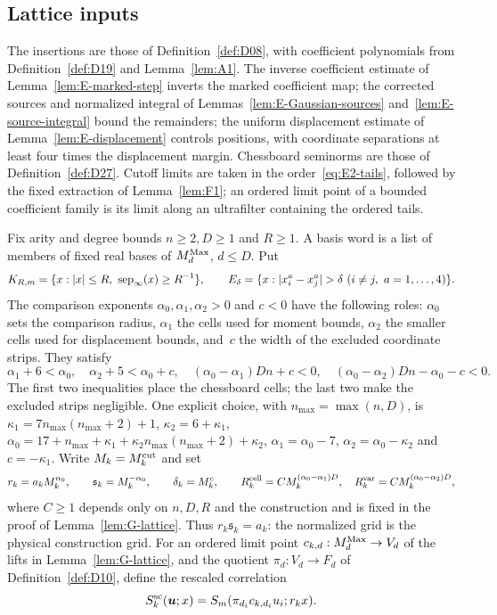 \subsection{Lattice inputs}\label{sec:G-lattice}

The insertions are those of Definition~\ref{def:D08}, with coefficient polynomials from Definition~\ref{def:D19} and Lemma~\ref{lem:A1}. The inverse coefficient estimate of Lemma~\ref{lem:E-marked-step} inverts the marked coefficient map; the corrected sources and normalized integral of Lemmas~\ref{lem:E-Gaussian-sources} and~\ref{lem:E-source-integral} bound the remainders; the uniform displacement estimate of Lemma~\ref{lem:E-displacement} controls positions, with coordinate separations at least four times the displacement margin. Chessboard seminorms are those of Definition~\ref{def:D27}. Cutoff limits are taken in the order~\eqref{eq:E2-tails}, followed by the fixed extraction of Lemma~\ref{lem:F1}; an ordered limit point of a bounded coefficient family is its limit along an ultrafilter containing the ordered tails.

Fix arity and degree bounds $n\ge2,D\ge1$ and $R\ge1$. A basis word is a list of members of fixed real bases of $M_{d}^{\mathrm{Max}}$, $d\le D$. Put
\begin{equation*}
K_{R,m}=\{x:|x|\le R,\ \sepinf(x)\ge R^{-1}\},\qquad
E_\delta=\{x:|x_i^a-x_j^a|>\delta\ (i\ne j,\ a=1,\ldots,4)\}.
\end{equation*}
The comparison exponents $\alpha_0,\alpha_1,\alpha_2>0$ and $c<0$ have the following roles: $\alpha_0$ sets the comparison radius, $\alpha_1$ the cells used for moment bounds, $\alpha_2$ the smaller cells used for displacement bounds, and~$c$ the width of the excluded coordinate strips. They satisfy
\begin{equation}\label{eq:G-exponents}
\alpha_1+6<\alpha_0,\quad \alpha_2+5<\alpha_0+c,\quad
(\alpha_0-\alpha_1)Dn+c<0,\quad
(\alpha_0-\alpha_2)Dn-\alpha_0-c<0.
\end{equation}
The first two inequalities place the chessboard cells; the last two make the excluded strips negligible. One explicit choice, with $n_{\max}=\max(n,D)$, is $\kappa_1=7n_{\max}(n_{\max}+2)+1$, $\kappa_2=6+\kappa_1$, $\alpha_0=17+n_{\max}+\kappa_1+\kappa_2n_{\max}(n_{\max}+2)+\kappa_2$, $\alpha_1=\alpha_0-7$, $\alpha_2=\alpha_0-\kappa_2$ and $c=-\kappa_1$. Write $M_k=M^{\mathrm{cut}}_k$ and set
\begin{equation}\label{eq:G-balance}
r_k=a_kM_k^{\alpha_0},\qquad \mathfrak s_k=M_k^{-\alpha_0},\qquad
\delta_k=M_k^{c},\qquad
R^{\rm cell}_k=CM_k^{(\alpha_0-\alpha_1)D},\quad R^{\rm var}_k=CM_k^{(\alpha_0-\alpha_2)D},
\end{equation}
where $C\ge1$ depends only on $n,D,R$ and the construction and is fixed in the proof of Lemma~\ref{lem:G-lattice}. Thus $r_k\mathfrak s_k=a_k$: the normalized grid is the physical construction grid. For an ordered limit point $c_{k,d}:M_{d}^{\mathrm{Max}}\to V_d$ of the lifts in Lemma~\ref{lem:G-lattice}, and the quotient $\pi_d:V_d\to F_d$ of Definition~\ref{def:D10}, define the rescaled correlation
\begin{equation*}
S^{\rm sc}_k(\boldsymbol u;x)=S_m(\pi_{d_i}c_{k,d_i}u_i;r_kx).
\end{equation*}

